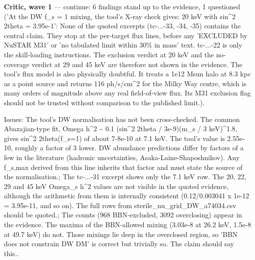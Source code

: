 \documentclass[11pt,a4paper]{article}
\begin{document}
\textbf{Critic, wave 1} --- continue: 6 findings stand up to the evidence, 1 questioned ('At the DW f\_s = 1 mixing, the tool's X-ray check gives: 20 keV with sin\textasciicircum{}2 2theta = 3.95e-1': None of the quoted excerpts (tc-...-33, -34, -35) contains the central claim. They stop at the per-target flux lines, before any 'EXCLUDED by NuSTAR M31' or 'no tabulated limit within 30\% in mass' text. tc-...-22 is only the skill-loading instructions. The exclusion verdict at 20 keV and the no-coverage verdict at 29 and 45 keV are therefore not shown in the evidence. The tool's flux model is also physically doubtful. It treats a 1e12 Msun halo at 8.3 kpc as a point source and returns 116 ph/s/cm\textasciicircum{}2 for the Milky Way centre, which is many orders of magnitude above any real field-of-view flux. Its M31 exclusion flag should not be trusted without comparison to the published limit.).

Issues: The tool's DW normalisation has not been cross-checked. The common Abazajian-type fit, Omega h\textasciicircum{}2 \textasciitilde{} 0.1 (sin\textasciicircum{}2 2theta / 3e-9)(m\_s / 3 keV)\textasciicircum{}1.8, gives sin\textasciicircum{}2 2theta(f\_s=1) of about 7-8e-10 at 7.1 keV. The tool's value is 2.55e-10, roughly a factor of 3 lower. DW abundance predictions differ by factors of a few in the literature (hadronic uncertainties, Asaka-Laine-Shaposhnikov). Any f\_s,max derived from this line inherits that factor and must state the source of the normalisation.; The tc-...-31 excerpt shows only the 7.1 keV row. The 20, 22, 29 and 45 keV Omega\_s h\textasciicircum{}2 values are not visible in the quoted evidence, although the arithmetic from them is internally consistent (0.12/0.003041 x 1e-12 = 3.95e-11, and so on). The full rows from sterile\_nu\_grid\_DW\_a74034.csv should be quoted.; The counts (968 BBN-excluded, 3092 overclosing) appear in the evidence. The maxima of the BBN-allowed mixing (3.03e-8 at 26.2 keV, 1.5e-8 at 49.7 keV) do not. Those mixings lie deep in the overclosed region, so 'BBN does not constrain DW DM' is correct but trivially so. The claim should say this..
\end{document}
